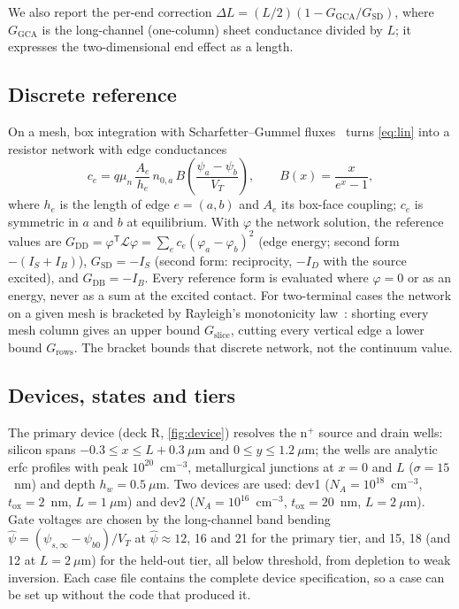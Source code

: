 \documentclass[11pt]{article}
\newcommand{\G}[1]{G_{\mathrm{#1}}}
\begin{document}
We also report the per-end correction $\Delta L = (L/2)(1 - \G{GCA}/\G{SD})$, where $\G{GCA}$ is the long-channel
(one-column) sheet conductance divided by $L$; it expresses the two-dimensional end effect as a length.

\subsection{Discrete reference}\label{sec:discrete}
On a mesh, box integration with Scharfetter--Gummel fluxes~\cite{ScharfetterGummel1969} turns \cref{eq:lin} into a
resistor network with edge conductances
\begin{equation}
c_e = q\mu_n\,\frac{A_e}{h_e}\,n_{0,a}\,B\!\left(\frac{\psi_a - \psi_b}{V_T}\right), \qquad B(x) = \frac{x}{e^x - 1},
\label{eq:edge}
\end{equation}
where $h_e$ is the length of edge $e = (a,b)$ and $A_e$ its box-face coupling; $c_e$ is symmetric in $a$ and $b$ at
equilibrium. With $\varphi$ the network solution, the reference values are $\G{DD} = \varphi^\mathsf{T}\mathcal{L}\varphi
= \sum_e c_e(\varphi_a-\varphi_b)^2$ (edge energy; second form $-(I_S + I_B)$), $\G{SD} = -I_S$ (second form: reciprocity,
$-I_D$ with the source excited), and $\G{DB} = -I_B$. Every reference form is evaluated where $\varphi = 0$ or as an
energy, never as a sum at the excited contact. For two-terminal cases the network on a given mesh is bracketed by
Rayleigh's monotonicity law~\cite{DoyleSnell1984}: shorting every mesh column gives an upper bound $G_\mathrm{slice}$,
cutting every vertical edge a lower bound $G_\mathrm{rows}$. The bracket bounds that discrete network, not the
continuum value.

\subsection{Devices, states and tiers}
The primary device (deck R, \cref{fig:device}) resolves the n$^+$ source and drain wells: silicon spans
$-0.3 \le x \le L + 0.3~\mu$m and $0 \le y \le 1.2~\mu$m; the wells are analytic erfc profiles with peak
$10^{20}$~cm$^{-3}$, metallurgical junctions at $x = 0$ and $L$ ($\sigma = 15$~nm) and depth $h_w = 0.5~\mu$m. Two
devices are used: dev1 ($N_A = 10^{18}$~cm$^{-3}$, $t_\mathrm{ox} = 2$~nm, $L = 1~\mu$m) and dev2 ($N_A = 10^{16}$~cm$^{-3}$,
$t_\mathrm{ox} = 20$~nm, $L = 2~\mu$m). Gate voltages are chosen by the long-channel band bending
$\hat\psi = (\psi_{s,\infty} - \psi_{b0})/V_T$ at $\hat\psi \approx 12$, 16 and 21 for the primary tier, and 15, 18 (and 12 at
$L = 2~\mu$m) for the held-out tier, all below threshold, from depletion to weak inversion. Each case file contains the complete device specification,
so a case can be set up without the code that produced it.
\end{document}
